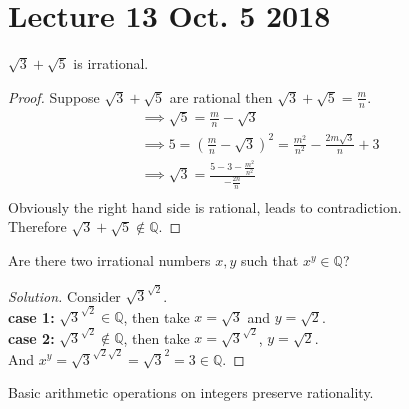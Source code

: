 \documentclass[11pt]{article}
\begin{document}
	\section{Lecture 13 Oct. 5 2018}
	\begin{example}
		$\sqrt{3} + \sqrt{5}$ is irrational.
	\end{example}
	\begin{proof}
		Suppose $\sqrt{3} + \sqrt{5}$ are rational then $\sqrt{3} + \sqrt{5} = \frac{m}{n}$. \\
		\begin{gather*}
			\implies \sqrt{5} = \frac{m}{n} - \sqrt{3} \\
			\implies 5 = (\frac{m}{n} - \sqrt{3})^2 = \frac{m^2}{n^2} - \frac{2m\sqrt{3}}{n} + 3 \\
			\implies \sqrt{3} = \frac{5-3-\frac{m^2}{n^2}}{-\frac{2n}{n}} \\
		\end{gather*}
		Obviously the right hand side is rational, leads to contradiction. \\
		Therefore $\sqrt{3} + \sqrt{5} \notin \mathbb{Q}$.
	\end{proof}
	
	\begin{example}
		Are there two irrational numbers $x,y$ such that $x^y \in \mathbb{Q}$?
	\end{example}
	\begin{proof}[Solution]
		Consider $\sqrt{3}^{\sqrt{2}}$. \\
		\textbf{case 1:} $\sqrt{3}^{\sqrt{2}} \in \mathbb{Q}$, then take $x = \sqrt{3}$ and $y = \sqrt{2}$. \\
		\textbf{case 2:} $\sqrt{3}^{\sqrt{2}} \notin \mathbb{Q}$, then take $x = \sqrt{3}^{\sqrt{2}}$, $y = \sqrt{2}$. \\
		And $x^y = \sqrt{3}^{\sqrt{2} \sqrt{2}} = \sqrt{3}^2 = 3 \in \mathbb{Q}$.
	\end{proof}
	
	\begin{remark}
		Basic arithmetic operations on integers preserve rationality.
	\end{remark}
	
\end{document}
